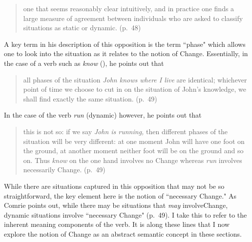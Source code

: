\begin{quote}
one that seems reasonably clear intuitively, and in practice one finds
a large measure of agreement between individuals who are asked to
classify situations as static or dynamic. (p.~48)
\end{quote}


A key term in his description of this opposition is the term ``phase"
which allows one to look into the situation as it relates to the
notion of Change.  Essentially, in the case of a verb such as \textit{know}
(), he points out that

\begin{quote}
  all phases of the situation \textit{John knows where I live} are
  identical; whichever point of time we choose to cut in on the
  situation of John’s knowledge, we shall find exactly the same
  situation. (p.~49)
\end{quote}

In the case of the verb \textit{run} (dynamic) however, he points out that

\begin{quote}
this is not so: if we say \textit{John is running,} then different
phases of the situation will be very different: at one moment John
will have one foot on the ground, at another moment neither foot will
be on the ground and so on. Thus \textit{know} on the one hand
involves no Change whereas \textit{run} involves necessarily Change. (p.~49)
\end{quote}

While there are situations captured in this opposition that may not be
so straightforward, the key element here is the notion of ``necessary
Change." As Comrie points out, while there may be  situations
that \textit{may} involve\linebreak Change, dynamic situations involve
``necessary Change" (p.~49). I take this to refer to the inherent
meaning components of the verb.  It is along these lines that I now
explore the notion of Change as an abstract semantic concept in these
sections.

